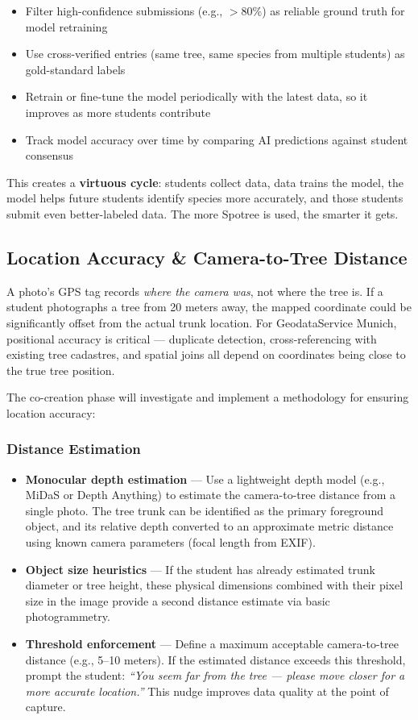\documentclass[11pt,a4paper]{article}
\begin{document}
\begin{itemize}
  \item Filter high-confidence submissions (e.g., $>$80\%) as reliable ground truth for model retraining
  \item Use cross-verified entries (same tree, same species from multiple students) as gold-standard labels
  \item Retrain or fine-tune the model periodically with the latest data, so it improves as more students contribute
  \item Track model accuracy over time by comparing AI predictions against student consensus
\end{itemize}

This creates a \textbf{virtuous cycle}: students collect data, data trains the model, the model helps future students identify species more accurately, and those students submit even better-labeled data. The more Spotree is used, the smarter it gets.

\subsection{Location Accuracy \& Camera-to-Tree Distance}

A photo's GPS tag records \textit{where the camera was}, not where the tree is. If a student photographs a tree from 20 meters away, the mapped coordinate could be significantly offset from the actual trunk location. For GeodataService Munich, positional accuracy is critical --- duplicate detection, cross-referencing with existing tree cadastres, and spatial joins all depend on coordinates being close to the true tree position.

The co-creation phase will investigate and implement a methodology for ensuring location accuracy:

\subsubsection{Distance Estimation}
\begin{itemize}
  \item \textbf{Monocular depth estimation} --- Use a lightweight depth model (e.g., MiDaS or Depth Anything) to estimate the camera-to-tree distance from a single photo. The tree trunk can be identified as the primary foreground object, and its relative depth converted to an approximate metric distance using known camera parameters (focal length from EXIF).
  \item \textbf{Object size heuristics} --- If the student has already estimated trunk diameter or tree height, these physical dimensions combined with their pixel size in the image provide a second distance estimate via basic photogrammetry.
  \item \textbf{Threshold enforcement} --- Define a maximum acceptable camera-to-tree distance (e.g., 5--10 meters). If the estimated distance exceeds this threshold, prompt the student: \textit{``You seem far from the tree --- please move closer for a more accurate location.''} This nudge improves data quality at the point of capture.
\end{itemize}
\end{document}
